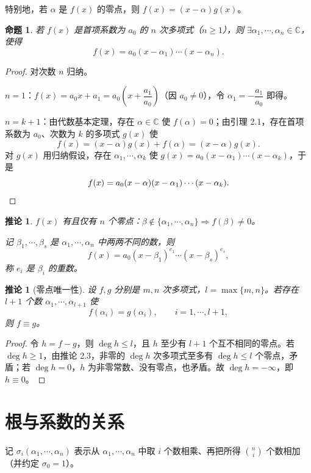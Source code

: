 \documentclass[UTF8,11pt]{ctexart}
\theoremstyle{cnthm}
\newtheorem{prop}[thm]{命题}
\newtheorem{cor}[thm]{推论}
\begin{document}
特别地，若 $\alpha$ 是 $f(x)$ 的零点，则 $f(x)=(x-\alpha)g(x)$。

\begin{prop}
若 $f(x)$ 是首项系数为 $a_0$ 的 $n$ 次多项式（$n\geq1$），则 $\exists\alpha_1,\cdots,\alpha_n\in\mathbb{C}$，使得
\[
f(x)=a_0(x-\alpha_1)\cdots(x-\alpha_n).
\]
\end{prop}

\begin{proof}
对次数 $n$ 归纳。

$n=1$：$f(x)=a_0x+a_1=a_0\left(x+\dfrac{a_1}{a_0}\right)$（因 $a_0\neq0$），令 $\alpha_1=-\dfrac{a_1}{a_0}$ 即得。

$n=k+1$：由代数基本定理，存在 $\alpha\in\mathbb{C}$ 使 $f(\alpha)=0$；由引理 2.1，存在首项系数为 $a_0$、次数为 $k$ 的多项式 $g(x)$ 使
\[
f(x)=(x-\alpha)g(x)+f(\alpha)=(x-\alpha)g(x).
\]
对 $g(x)$ 用归纳假设，存在 $\alpha_1,\cdots,\alpha_k$ 使 $g(x)=a_0(x-\alpha_1)\cdots(x-\alpha_k)$，于是
\[
f(x)=a_0(x-\alpha)(x-\alpha_1)\cdots(x-\alpha_k). \qedhere
\]
\end{proof}

\begin{cor}
$f(x)$ 有且仅有 $n$ 个零点：$\beta\notin\{\alpha_1,\cdots,\alpha_n\}\Longrightarrow f(\beta)\neq0$。

记 $\beta_1,\cdots,\beta_s$ 是 $\alpha_1,\cdots,\alpha_n$ 中两两不同的数，则
\[
f(x)=a_0(x-\beta_1)^{e_1}\cdots(x-\beta_s)^{e_s},
\]
称 $e_i$ 是 $\beta_i$ 的重数。
\end{cor}

\begin{cor}[零点唯一性]
设 $f,g$ 分别是 $m,n$ 次多项式，$l=\max\{m,n\}$。若存在 $l+1$ 个数 $\alpha_1,\cdots,\alpha_{l+1}$ 使
\[
f(\alpha_i)=g(\alpha_i),\qquad i=1,\cdots,l+1,
\]
则 $f\equiv g$。
\end{cor}

\begin{proof}
令 $h=f-g$，则 $\deg h\le l$，且 $h$ 至少有 $l+1$ 个互不相同的零点。若 $\deg h\ge1$，由推论 2.3，非零的 $\deg h$ 次多项式至多有 $\deg h\le l$ 个零点，矛盾；若 $\deg h=0$，$h$ 为非零常数、没有零点，也矛盾。故 $\deg h=-\infty$，即 $h\equiv0$。
\end{proof}

\section{根与系数的关系}

记 $\sigma_i(\alpha_1,\cdots,\alpha_n)$ 表示从 $\alpha_1,\cdots,\alpha_n$ 中取 $i$ 个数相乘、再把所得 $\binom{n}{i}$ 个数相加（并约定 $\sigma_0=1$）。
\end{document}
